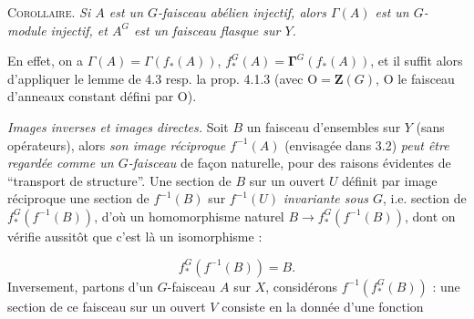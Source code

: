 \textsc{Corollaire.} \textit{Si $A$ est un $G$-faisceau abélien
injectif, alors $\Gamma(A)$ est un $G$-module injectif, et $A^G$ est un
faisceau flasque sur $Y$.}

En effet, on a $\Gamma(A)=\Gamma(f_*(A))$, $f_*^G(A)=\mathbf{\Gamma}^G(f_*(A))$, et il
suffit alors d'appliquer le lemme de 4.3 resp. la prop. 4.1.3 (avec
${\mathrm O}=\mathbf Z(G)$, ${\mathrm O}$ le faisceau d'anneaux constant défini par ${\mathrm O}$).

\textit{Images inverses et images directes.} Soit $B$ un faisceau
d'ensembles sur $Y$ (sans opérateurs), alors \textit{son image réciproque
$f^{-1}(A)$} (envisagée dans 3.2) \textit{peut être regardée comme un
$G$-faisceau} de façon naturelle, pour des raisons évidentes de ``transport
de structure''. Une section de $B$ sur un ouvert $U$ définit par image
réciproque une section de $f^{-1}(B)$ sur $f^{-1}(U)$ \textit{invariante sous
$G$}, i.e. section de $f_*^G(f^{-1}(B))$, d'où un homomorphisme naturel
$B\to f_*^G(f^{-1}(B))$, dont on vérifie aussitôt que c'est là un
isomorphisme :

\[
f_*^G(f^{-1}(B))=B.
\tag{5.1.1}
\]
Inversement, partons d'un $G$-faisceau $A$ sur $X$, considérons
$f^{-1}(f_*^G(B))$ : une section de ce faisceau sur un ouvert $V$ consiste en
la donnée d'une fonction

